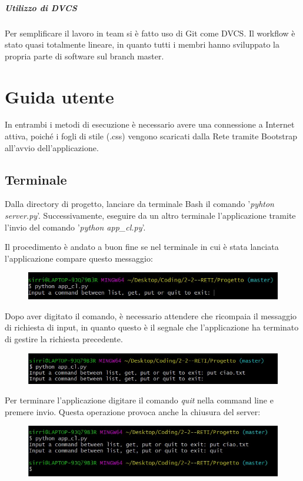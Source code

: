 \documentclass[a4paper,12pt]{report}
\begin{document}
\paragraph{Utilizzo di DVCS}
Per semplificare il lavoro in team si è fatto uso di Git come DVCS. Il workflow è stato quasi totalmente lineare, in quanto tutti i membri hanno sviluppato la propria parte di software sul branch master.

\chapter{Guida utente}
In entrambi i metodi di esecuzione è necessario avere una connessione a Internet attiva, poiché i fogli di stile (.css) vengono scaricati dalla Rete tramite Bootstrap all'avvio dell'applicazione.

\section{Terminale}
Dalla directory di progetto, lanciare da terminale Bash il comando '\textit{pyhton server.py}'. Successivamente, eseguire da un altro terminale l'applicazione tramite l'invio del comando '\textit{python app\_cl.py}'.

Il procedimento è andato a buon fine se nel terminale in cui è stata lanciata l'applicazione compare questo messaggio:
\begin{figure}[H]
    \centering
    \includegraphics[width=\textwidth]{img/terminale.jpg}
\end{figure}

Dopo aver digitato il comando, è necessario attendere che ricompaia il messaggio di richiesta di input, in quanto questo è il segnale che l'applicazione ha terminato di gestire la richiesta precedente.
\begin{figure}[H]
    \centering
    \includegraphics[width=\textwidth]{img/terminale_1.jpg}
\end{figure}

Per terminare l'applicazione digitare il comando \textit{quit} nella command line e premere invio. Questa operazione provoca anche la chiusura del server:
\begin{figure}[H]
    \centering
    \includegraphics[width=\textwidth]{img/terminale_2.jpg}
\end{figure}
\end{document}
